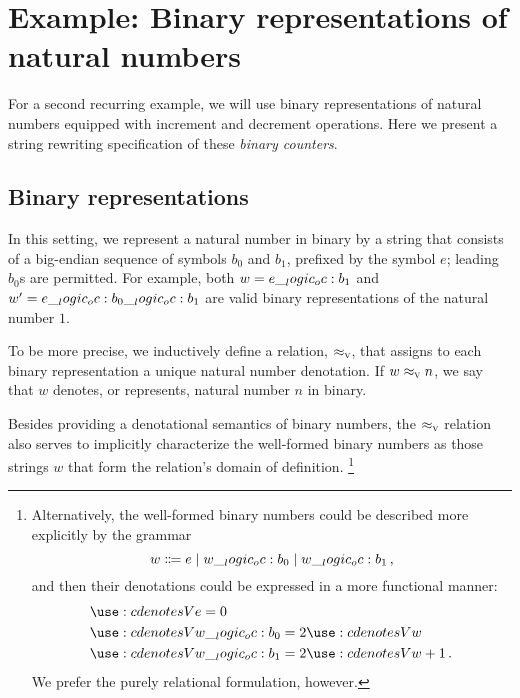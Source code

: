 \section{Example: Binary representations of natural numbers}\label{sec:string-rewriting:binary-counter}

For a second recurring example, we will use
binary representations of natural numbers equipped with increment and decrement operations. %
Here we present a string rewriting specification of these \emph{binary counters}.

\subsection{Binary representations}

In this setting, we represent a natural number in binary by a string that consists of a big-endian sequence of symbols $b_0$ and $b_1$, prefixed by the symbol $e$; leading $b_0$s are permitted.
For example, both $w = e \__logic_oc: b_1$ and $w' = e \__logic_oc: b_0 \__logic_oc: b_1$ are valid binary representations of the natural number $1$.

To be more precise, we inductively define a relation, $ \approx\sb{\text{\normalfont\scshape v}} $, that assigns to each binary representation a unique natural number denotation.
If $w \approx\sb{\text{\normalfont\scshape v}} n$, we say that $w$ denotes, or represents, natural number $n$ in binary.
Besides providing a denotational semantics of binary numbers, the $ \approx\sb{\text{\normalfont\scshape v}} $ relation also serves to implicitly characterize the well-formed binary numbers as those strings $w$ that form the relation's domain of definition.%
\footnote{Alternatively, the well-formed binary numbers could be described more explicitly by the grammar
\begin{equation*}
  w \Coloneqq e \mid w \__logic_oc: b_0 \mid w \__logic_oc: b_1
  \,,
\end{equation*}
and then their denotations could be expressed in a more functional manner:
\begin{equation*}
  \begin{lgathered}
    \deno[V]{e} = 0 \\
    \deno[V]{w \oc b_0} = 2 \deno[V]{w} \\
    \deno[V]{w \oc b_1} = 2 \deno[V]{w} + 1
    \,.
  \end{lgathered}
\end{equation*}
We prefer the purely relational formulation, however.%
}


